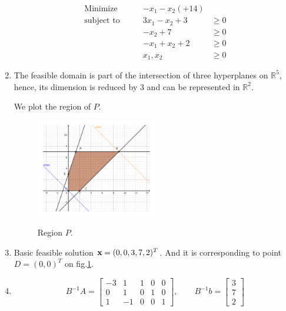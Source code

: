 \documentclass[12pt]{article}
\begin{document}
\begin{enumerate}[label = (\alph*)]
$$
\begin{aligned}
\text{Minimize} \qquad & -x_1 - x_2 (+14) &  \\
\text{subject\  to} \qquad & 3x_1 - x_2 + 3 & \geqslant 0\\
 & -x_2 + 7 & \geqslant 0 \\
 & -x_1 + x_2 + 2 & \geqslant 0 \\
 & x_1, x_2 & \geqslant 0
\end{aligned}
$$

\item

The feasible domain is part of the intersection of three hyperplanes on $\mathbb R^5$, hence, its dimension is reduced by 3 and can be represented in $\mathbb R^2$.

We plot the region of $P$.

 \begin{figure}[htbp]
  \caption{Region $P$.}
  \centering
    \includegraphics[width=0.5\textwidth]{problem3.pdf}
    \label{problem3}
 \end{figure}

\FloatBarrier


\item

Basic feasible solution  $\textbf x = (0,0, 3,7,2)^T$. And it is corresponding to point $D = (0,0)^T$ on fig.\ref{problem3}.

\item

$$
B^{-1}A = \begin{bmatrix}
    -3 &    1 &    1 &    0 &    0 \\
     0  &   1  &   0   &  1   &  0 \\
     1   & -1  &   0  &   0  &   1
\end{bmatrix},  \qquad
B^{-1}b = \begin{bmatrix}
3 \\ 7 \\ 2
\end{bmatrix}
$$


\end{enumerate}
\end{document}
